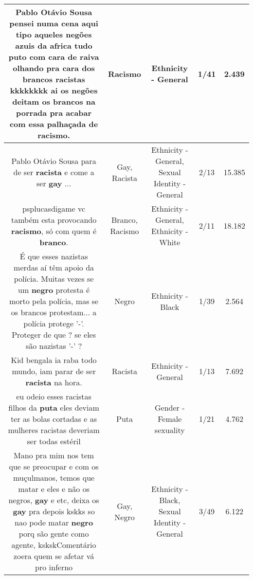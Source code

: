 \documentclass[11pt]{article}
\newlength\mylength
\begin{document}
\begin{center}
\begin{longtable}{|C{.65\mylength}|C{.30\mylength}|C{.12\mylength}|C{.12\mylength}|C{.12\mylength}|}
  \small Pablo Otávio Sousa pensei numa cena aqui tipo aqueles negões azuis da africa tudo puto com cara de raiva olhando pra cara dos brancos racistas kkkkkkkk ai os negões deitam os brancos na porrada pra acabar com essa palhaçada de \textbf{racismo}.\normalsize   & Racismo & Ethnicity - General & 1/41 & 2.439 \\  \hline
  \small Pablo Otávio Sousa para de ser \textbf{racista} e come a ser \textbf{gay} ...\normalsize   & Gay, Racista & Ethnicity - General, Sexual Identity - General & 2/13 & 15.385 \\  \hline
  \small psplucasdigame vc também esta provocando \textbf{racismo}, só com quem é \textbf{branco}.\normalsize   & Branco, Racismo & Ethnicity - General, Ethnicity - White & 2/11 & 18.182 \\  \hline
  \small É que esses nazistas merdas aí têm apoio da polícia. Muitas vezes se um \textbf{negro} protesta é morto pela polícia, mas se os brancos protestam... a polícia protege '-'. Proteger de que ? se eles são nazistas '-' ?\normalsize   & Negro & Ethnicity - Black & 1/39 & 2.564 \\  \hline
  \small Kid bengala ia raba todo mundo, iam parar de ser \textbf{racista} na hora.\normalsize   & Racista & Ethnicity - General & 1/13 & 7.692 \\  \hline
  \small eu odeio esses racistas filhos da \textbf{puta} eles deviam ter as bolas cortadas e as mulheres racistas deveriam ser todas estéril\normalsize   & Puta & Gender - Female sexuality & 1/21 & 4.762 \\  \hline
  \small Mano pra mim nos tem que se preocupar e com os muçulmanos, temos que matar e eles e não os negros,  \textbf{gay} e etc,  deixa os \textbf{gay} pra depois kskks so nao pode matar \textbf{negro} porq  são gente como agente,  kskskComentário zoera quem se afetar vá pro inferno\normalsize   & Gay, Negro & Ethnicity - Black, Sexual Identity - General & 3/49 & 6.122 \\  \hline

\end{longtable}
\end{center}
\end{document}
